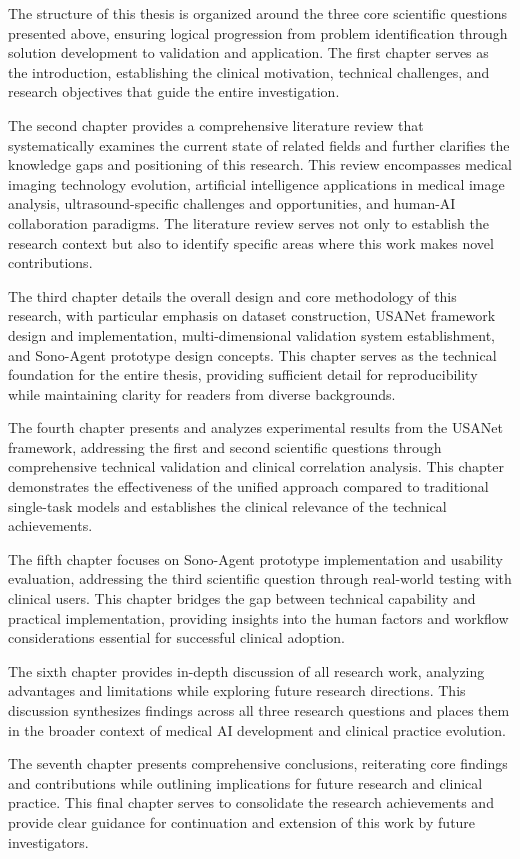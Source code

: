 The structure of this thesis is organized around the three core scientific questions presented above, ensuring logical progression from problem identification through solution development to validation and application. The first chapter serves as the introduction, establishing the clinical motivation, technical challenges, and research objectives that guide the entire investigation.

The second chapter provides a comprehensive literature review that systematically examines the current state of related fields and further clarifies the knowledge gaps and positioning of this research. This review encompasses medical imaging technology evolution, artificial intelligence applications in medical image analysis, ultrasound-specific challenges and opportunities, and human-AI collaboration paradigms. The literature review serves not only to establish the research context but also to identify specific areas where this work makes novel contributions.

The third chapter details the overall design and core methodology of this research, with particular emphasis on dataset construction, USANet framework design and implementation, multi-dimensional validation system establishment, and Sono-Agent prototype design concepts. This chapter serves as the technical foundation for the entire thesis, providing sufficient detail for reproducibility while maintaining clarity for readers from diverse backgrounds.

The fourth chapter presents and analyzes experimental results from the USANet framework, addressing the first and second scientific questions through comprehensive technical validation and clinical correlation analysis. This chapter demonstrates the effectiveness of the unified approach compared to traditional single-task models and establishes the clinical relevance of the technical achievements.

The fifth chapter focuses on Sono-Agent prototype implementation and usability evaluation, addressing the third scientific question through real-world testing with clinical users. This chapter bridges the gap between technical capability and practical implementation, providing insights into the human factors and workflow considerations essential for successful clinical adoption.

The sixth chapter provides in-depth discussion of all research work, analyzing advantages and limitations while exploring future research directions. This discussion synthesizes findings across all three research questions and places them in the broader context of medical AI development and clinical practice evolution.

The seventh chapter presents comprehensive conclusions, reiterating core findings and contributions while outlining implications for future research and clinical practice. This final chapter serves to consolidate the research achievements and provide clear guidance for continuation and extension of this work by future investigators.
